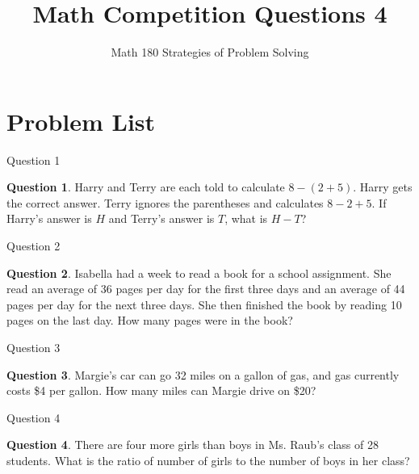 \documentclass[handout]{beamer}
\title{Math Competition Questions 4}
\subtitle
{Math 180 Strategies of Problem Solving}
\author[W.R. Casper] %
{}%
\institute[California State University Fullerton] %
{
  Department of Mathematics\\
  California State University Fullerton}
\theoremstyle{definition}
\newtheorem{quest}{Question}
\begin{document}
\begin{frame}
  \titlepage
\end{frame}





\section{Problem List}
\begin{frame}{Question 1}
\begin{quest}
Harry and Terry are each told to calculate $8-(2+5)$. Harry gets the correct answer. Terry ignores the parentheses and calculates $8-2+5$. If Harry's answer is $H$ and Terry's answer is $T$, what is $H-T$?
\end{quest}
\end{frame}

\begin{frame}{Question 2}
\begin{quest}
Isabella had a week to read a book for a school assignment. She read an average of 36 pages per day for the first three days and an average of 44 pages per day for the next three days. She then finished the book by reading 10 pages on the last day. How many pages were in the book?
\end{quest}
\end{frame}

\begin{frame}{Question 3}
\begin{quest}
Margie's car can go 32 miles on a gallon of gas, and gas currently costs \$4 per gallon. How many miles can Margie drive on \$20?
\end{quest}
\end{frame}

\begin{frame}{Question 4}
\begin{quest}
There are four more girls than boys in Ms. Raub's class of 28 students. What is the ratio of number of girls to the number of boys in her class?
\end{quest}
\end{frame}
\end{document}
